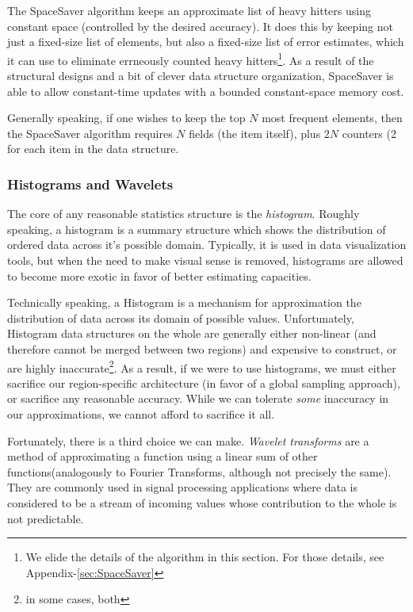The SpaceSaver algorithm keeps an approximate list of heavy hitters using constant space (controlled by the desired accuracy). It does this by keeping not just a fixed-size list of elements, but also a fixed-size list of error estimates, which it can use to eliminate errneously counted heavy hitters\footnote{We elide the details of the algorithm in this section. For those details, see Appendix-\ref{sec:SpaceSaver}}. As a result of the structural designs and a bit of clever data structure organization, SpaceSaver is able to allow constant-time updates with a bounded constant-space memory cost.

Generally speaking, if one wishes to keep the top $N$ most frequent elements, then the SpaceSaver algorithm requires $N$ fields (the item itself), plus $2N$ counters (2 for each item in the data structure. 

\subsubsection{Histograms and Wavelets}
The core of any reasonable statistics structure is the \emph{histogram}. Roughly speaking, a histogram is a summary structure which shows the distribution of ordered data across it's possible domain. Typically, it is used in data visualization tools, but when the need to make visual sense is removed, histograms are allowed to become more exotic in favor of better estimating capacities.

Technically speaking, a Histogram is a mechanism for approximation the distribution of data across its domain of possible values. Unfortunately, Histogram data structures on the whole are generally either non-linear (and therefore cannot be merged between two regions) and expensive to construct, or are highly inaccurate\footnote{in some cases, both}. As a result, if we were to use histograms, we must either sacrifice our region-specific architecture (in favor of a global sampling approach), or sacrifice any reasonable accuracy. While we can tolerate \emph{some} inaccuracy in our approximations, we cannot afford to sacrifice it all.

Fortunately, there is a third choice we can make. \emph{Wavelet transforms} are a method of approximating a function using a linear sum of other functions(analogously to Fourier Transforms, although not precisely the same). They are commonly used in signal processing applications where data is considered to be a stream of incoming values whose contribution to the whole is not predictable.

